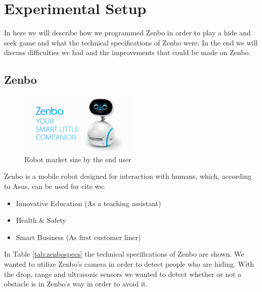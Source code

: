 \documentclass[conference]{IEEEtran}
\begin{document}
\section{Experimental Setup}
In here we will describe how we programmed Zenbo in order to play a hide and seek game and what the technical specifications 
of Zenbo were. In the end we will discuss difficulties we had and the improvements that could be made on Zenbo.\\
\subsection{Zenbo}
\begin{figure}[h]  \label{fig:zenbopic}
	\begin{center}
		\includegraphics[width=0.5\textwidth]{pics/ZenboPicture.jpg}
	\end{center}
	\caption{Robot market size by the end user}
\end{figure}
Zenbo is a mobile robot designed for interaction with humans, which, according to Asus, can be used for \cite{b6} cite ws:
\begin{itemize}
	\item Innovative Education (As a teaching assistant)
	\item Health \& Safety
	\item Smart Business (As first customer liner)
\end{itemize}
In Table \ref{tab:zenbospecs} the technical specifications of Zenbo are shown. We wanted to utilize Zenbo's camera in order to detect 
people who are hiding. With the drop, range and ultrasonic sensors we wanted to detect whether or not a obstacle is in Zenbo's way in order to avoid it.
\end{document}
